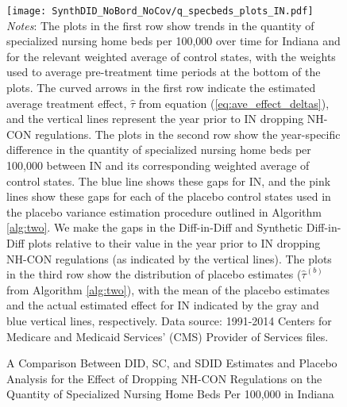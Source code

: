 \documentclass[../Main.tex]{subfiles}
\begin{document}
\newpage
{}
\begin{figure}[t] 
    \setlength{}
	\caption{\label{fig:q_specbeds_plots_in} \centering A Comparison Between DID, SC, and SDID Estimates and Placebo Analysis for the Effect of Dropping NH-CON Regulations on the Quantity of Specialized Nursing Home Beds Per 100,000 in Indiana} {\centering\texttt{[image: SynthDID\_NoBord\_NoCov/q\_specbeds\_plots\_IN.pdf]}}
    \vspace{-1.4cm}\\
    \scriptsize
		\textit{Notes}: The plots in the first row show trends in the quantity of specialized nursing home beds per 100,000 over time for Indiana and for the relevant weighted average of control states, with the weights used to average pre-treatment time periods at the bottom of the plots. The curved arrows in the first row indicate the estimated average treatment effect, $\hat{\tau}$ from equation (\ref{eq:ave_effect_deltas}), and the vertical lines represent the year prior to IN dropping NH-CON regulations. The plots in the second row show the year-specific difference in the quantity of specialized nursing home beds per 100,000 between IN and its corresponding weighted average of control states. The blue line shows these gaps for IN, and the pink lines show these gaps for each of the placebo control states used in the placebo variance estimation procedure outlined in Algorithm \ref{alg:two}. We make the gaps in the Diff-in-Diff and Synthetic Diff-in-Diff plots relative to their value in the year prior to IN dropping NH-CON regulations (as indicated by the vertical lines). The plots in the third row show the distribution of placebo estimates ($\hat{\tau}^{(b)}$ from Algorithm \ref{alg:two}), with the mean of the placebo estimates and the actual estimated effect for IN indicated by the gray and blue vertical lines, respectively. Data source: 1991-2014 Centers for Medicare and Medicaid Services’ (CMS) Provider of Services files.
\end{figure}
\restoregeometry
\clearpage
\end{document}
